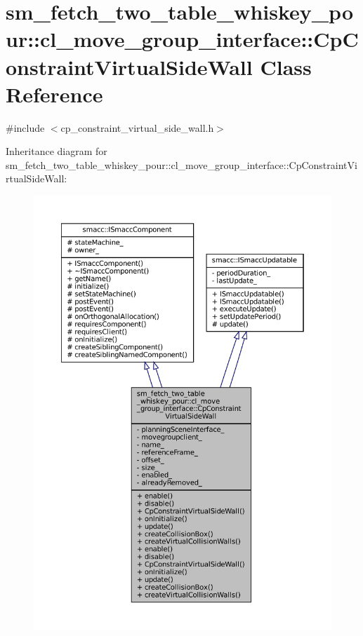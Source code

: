 \hypertarget{classsm__fetch__two__table__whiskey__pour_1_1cl__move__group__interface_1_1CpConstraintVirtualSideWall}{}\section{sm\+\_\+fetch\+\_\+two\+\_\+table\+\_\+whiskey\+\_\+pour\+:\+:cl\+\_\+move\+\_\+group\+\_\+interface\+:\+:Cp\+Constraint\+Virtual\+Side\+Wall Class Reference}
\label{classsm__fetch__two__table__whiskey__pour_1_1cl__move__group__interface_1_1CpConstraintVirtualSideWall}


{\ttfamily \#include $<$cp\+\_\+constraint\+\_\+virtual\+\_\+side\+\_\+wall.\+h$>$}



Inheritance diagram for sm\+\_\+fetch\+\_\+two\+\_\+table\+\_\+whiskey\+\_\+pour\+:\+:cl\+\_\+move\+\_\+group\+\_\+interface\+:\+:Cp\+Constraint\+Virtual\+Side\+Wall\+:
\nopagebreak
\begin{figure}[H]
\begin{center}
\leavevmode
\includegraphics[width=350pt]{classsm__fetch__two__table__whiskey__pour_1_1cl__move__group__interface_1_1CpConstraintVirtualSideWall__inherit__graph}
\end{center}
\end{figure}



